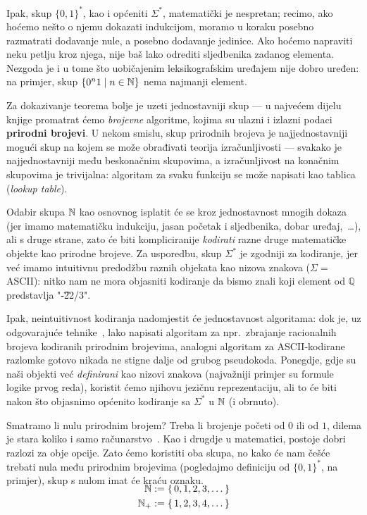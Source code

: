 Ipak, skup $\{0,1\}^*$, kao i općeniti $\Sigma^*$, matematički je nespretan; recimo, ako hoćemo nešto o njemu dokazati indukcijom, moramo u koraku posebno razmatrati dodavanje nule, a posebno dodavanje jedinice. Ako hoćemo napraviti neku petlju kroz njega, nije baš lako odrediti sljedbenika zadanog elementa. Nezgoda je i u tome što uobičajenim leksikografskim uređajem nije dobro uređen: na primjer, skup $\{0^n1\mid n\in{\mathbb N}\}$ nema najmanji element.

Za dokazivanje teorema bolje je uzeti jednostavniji skup --- u najvećem dijelu knjige promatrat ćemo \emph{brojevne} algoritme, kojima su ulazni i izlazni podaci \textbf{prirodni brojevi}. U nekom smislu, skup prirodnih brojeva je najjednostavniji mogući skup na kojem se može obrađivati teorija izračunljivosti --- svakako je najjednostavniji među beskonačnim skupovima, a izračunljivost na konačnim skupovima je trivijalna: algoritam za svaku funkciju se može napisati kao tablica (\emph{lookup table}).

Odabir skupa ${\mathbb N}$ kao osnovnog isplatit će se kroz jednostavnost mnogih dokaza (jer imamo matematičku indukciju, jasan početak i sljedbenika, dobar uređaj,~\ldots), ali s druge strane, zato će biti kompliciranije \emph{kodirati} razne druge matematičke objekte kao prirodne brojeve. Za usporedbu, skup $\Sigma^*$ je zgodniji za kodiranje, jer već imamo intuitivnu predodžbu raznih objekata kao nizova znakova ($\Sigma=$ ASCII\@): nitko nam ne mora objasniti kodiranje da bismo znali koji element od $\mathbb Q$ predstavlja "\t{-22/3}".

Ipak, neintuitivnost kodiranja nadomjestit će jednostavnost algoritama: dok je, uz odgovarajuće tehnike~\cite{posav}, lako napisati algoritam za npr.\ zbrajanje racionalnih brojeva kodiranih prirodnim brojevima, analogni algoritam za ASCII-kodirane razlomke gotovo nikada ne stigne dalje od grubog pseudokoda. Ponegdje, gdje su naši objekti već \emph{definirani} kao nizovi znakova (najvažniji primjer su formule logike prvog reda), koristit ćemo njihovu jezičnu reprezentaciju, ali to će biti nakon što objasnimo općenito kodiranje sa $\Sigma^*$ u ${\mathbb N}$ (i obrnuto).

Smatramo li nulu prirodnim brojem? Treba li brojenje početi od $0$ ili od $1$, dilema je stara koliko i samo računarstvo~\cite{note:EWD831}. Kao i drugdje u matematici, postoje dobri razlozi za obje opcije. Zato ćemo koristiti oba skupa, no kako će nam češće trebati nula među prirodnim brojevima (pogledajmo definiciju od $\{0,1\}^*$, na primjer), skup s nulom imat će kraću oznaku.
\begin{align}
    \SwapAboveDisplaySkip
\N&:=\{\,0,1,2,3,\dotsc\}\\
\N_+&:=\{\,1,2,3,4,\dotsc\}
\end{align}

